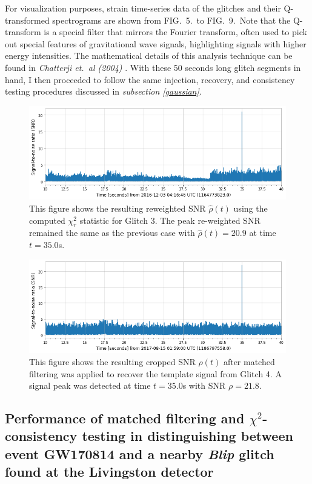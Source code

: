 \documentclass[preprint,
letterpaper,
 amsmath,amssymb,
 aps,
]{revtex4-2}
\begin{document}
For visualization purposes, strain time-series data of the glitches and their Q-transformed spectrograms are shown from FIG.\ 5.\ to FIG.\ 9.\ Note that the Q-transform is a special filter that mirrors the Fourier transform, often used to pick out special features of gravitational wave signals, highlighting signals with higher energy intensities. The mathematical details of this analysis technique can be found in \textit{Chatterji et.\ al (2004)} \cite{qtransform}.  With these 50 seconds long glitch segments in hand, I then proceeded to follow the same injection, recovery, and consistency testing procedures discussed in \textit{subsection \ref{gaussian}}. 

\begin{figure}[t]
\includegraphics[width = .9\textwidth]{reweighted glitch 3.png}
\caption{This figure shows the resulting reweighted SNR $\hat{\rho}(t)$ using the computed $\chi^2_r$ statistic for Glitch 3. The peak re-weighted SNR remained the same as the previous case with $\hat{\rho}(t)=20.9$ at time $t=35.0$s.}
\centering
\end{figure}

\begin{figure}[t] \label{snr 4}
\includegraphics[width = .9\textwidth]{glitch 4 template 1.png}
\caption{This figure shows the resulting cropped SNR $\rho(t)$ after matched filtering was applied to recover the template signal from Glitch 4. A signal peak was detected at time $t = 35.0$s with SNR $\rho = 21.8$.}
\centering
\end{figure}

\subsection{Performance of matched filtering and $\chi^2$-consistency testing in distinguishing between event GW170814 and a nearby \textit{Blip} glitch found at the Livingston detector}
\end{document}
